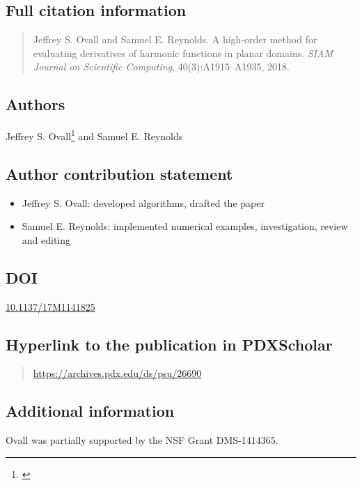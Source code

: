 \subsection*{Full citation information}
  \singlespacing
  \begin{quote}
    Jeffrey S. Ovall and Samuel E. Reynolds.
    A high-order method for evaluating derivatives of harmonic functions in planar domains.
    \textit{SIAM Journal on Scientific Computing}, 40(3):A1915--A1935, 2018.
  \end{quote}
  \doublespacing

\subsection*{Authors}
  Jeffrey S. Ovall\footnote{\label{PSU-affil-1}\PSU} and
  Samuel E. Reynolds

\subsection*{Author contribution statement}
  \singlespacing
  \begin{itemize}
    \item Jeffrey S. Ovall:  developed algorithms, drafted the paper
    \item Samuel E. Reynolds: implemented numerical examples, investigation, review and editing
  \end{itemize}
  \doublespacing

\subsection*{DOI}
  \href{https://doi.org/10.1137/17M1141825}{10.1137/17M1141825}

\subsection*{Hyperlink to the publication in PDXScholar}
  \begin{quote}
    \url{https://archives.pdx.edu/ds/psu/26690}
  \end{quote}

\subsection*{Additional information}
  Ovall was partially supported by the NSF Grant DMS-1414365.